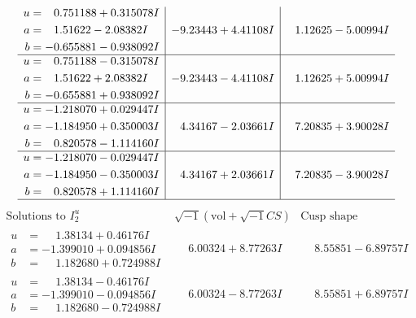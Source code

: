 \documentclass[1p]{elsarticle_modified}
\theoremstyle{definition}
\newcommand{\I}{\sqrt{-1}}
\begin{document}
$$\begin{array}{c|c|c}
\begin{aligned}
u &= \phantom{-}0.751188 + 0.315078 I \\
a &= \phantom{-}1.51622 - 2.08382 I \\
b &= -0.655881 - 0.938092 I\end{aligned}
 & -9.23443 + 4.41108 I & \phantom{-}1.12625 - 5.00994 I \\ \hline\begin{aligned}
u &= \phantom{-}0.751188 - 0.315078 I \\
a &= \phantom{-}1.51622 + 2.08382 I \\
b &= -0.655881 + 0.938092 I\end{aligned}
 & -9.23443 - 4.41108 I & \phantom{-}1.12625 + 5.00994 I \\ \hline\begin{aligned}
u &= -1.218070 + 0.029447 I \\
a &= -1.184950 + 0.350003 I \\
b &= \phantom{-}0.820578 - 1.114160 I\end{aligned}
 & \phantom{-}4.34167 - 2.03661 I & \phantom{-}7.20835 + 3.90028 I \\ \hline\begin{aligned}
u &= -1.218070 - 0.029447 I \\
a &= -1.184950 - 0.350003 I \\
b &= \phantom{-}0.820578 + 1.114160 I\end{aligned}
 & \phantom{-}4.34167 + 2.03661 I & \phantom{-}7.20835 - 3.90028 I\\
 \hline 
 \end{array}$$\newpage$$\begin{array}{c|c|c}  
\text{Solutions to }I^u_{2}& \I (\text{vol} + \sqrt{-1}CS) & \text{Cusp shape}\\
 \hline 
\begin{aligned}
u &= \phantom{-}1.38134 + 0.46176 I \\
a &= -1.399010 + 0.094856 I \\
b &= \phantom{-}1.182680 + 0.724988 I\end{aligned}
 & \phantom{-}6.00324 + 8.77263 I & \phantom{-}8.55851 - 6.89757 I \\ \hline\begin{aligned}
u &= \phantom{-}1.38134 - 0.46176 I \\
a &= -1.399010 - 0.094856 I \\
b &= \phantom{-}1.182680 - 0.724988 I\end{aligned}
 & \phantom{-}6.00324 - 8.77263 I & \phantom{-}8.55851 + 6.89757 I \\ \hline\begin{aligned}

\end{aligned}
\end{array}$$
\end{document}
